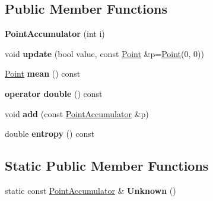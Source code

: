 \subsection*{Public Member Functions}
\begin{DoxyCompactItemize}
\item 
\mbox{\label{structGMapping_1_1PointAccumulator_a2dcf27d200b53ba10f16c1b701bd0503}} 
{\bfseries Point\+Accumulator} (int i)
\item 
\mbox{\label{structGMapping_1_1PointAccumulator_ac414ab2f3d79d50fbb1b5326423fc84f}} 
void {\bfseries update} (bool value, const \hyperlink{structGMapping_1_1point}{Point} \&p=\hyperlink{structGMapping_1_1point}{Point}(0, 0))
\item 
\mbox{\label{structGMapping_1_1PointAccumulator_aee73954066c51b648da5b9af3cd2089d}} 
\hyperlink{structGMapping_1_1point}{Point} {\bfseries mean} () const
\item 
\mbox{\label{structGMapping_1_1PointAccumulator_abdfda9e51d85cb2cc70f87b446be47f1}} 
{\bfseries operator double} () const
\item 
\mbox{\label{structGMapping_1_1PointAccumulator_a81e890f24d04e5f04433ba2fc7c51be8}} 
void {\bfseries add} (const \hyperlink{structGMapping_1_1PointAccumulator}{Point\+Accumulator} \&p)
\item 
\mbox{\label{structGMapping_1_1PointAccumulator_a723dc2aaaca092a1e33246f416feb59e}} 
double {\bfseries entropy} () const
\end{DoxyCompactItemize}
\subsection*{Static Public Member Functions}
\begin{DoxyCompactItemize}
\item 
\mbox{\label{structGMapping_1_1PointAccumulator_a81db0b19d19a84bdf4a3ac01b0796e8f}} 
static const \hyperlink{structGMapping_1_1PointAccumulator}{Point\+Accumulator} \& {\bfseries Unknown} ()
\end{DoxyCompactItemize}
